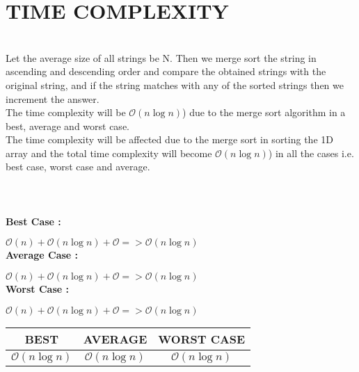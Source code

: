 \documentclass[conference]{IEEEtran}
\begin{document}
\section{TIME COMPLEXITY}\\
Let the average size of all strings be N.
Then we merge sort the string in ascending and 
descending order and compare the obtained strings 
with the original string, and if the string matches 
with any of the sorted strings then we increment the 
answer.\\ 
The time complexity will be \begin{math} \mathcal{O}(n\log{}n)\end{math}) due to the 
merge sort algorithm in a best, average and worst 
case.\\ 
The time complexity will be affected due to the 
merge sort in sorting the 1D array and the total 
time complexity will become \begin{math} \mathcal{O}(n\log{}n)\end{math}) in 
all the cases i.e. best case, worst case and 
average. 
\begin{math}
\end{math}
\\\\\\\\\textbf{Best Case : }

\begin{math}
\mathcal{O}(n) + \mathcal{O}(n\log{}n) + \mathcal{O} => \mathcal{O}(n\log{}n)
\end{math}
\\\textbf{Average Case : }


\begin{math}
\mathcal{O}(n) + \mathcal{O}(n\log{}n) + \mathcal{O} => \mathcal{O}(n\log{}n)
\end{math}
\\\textbf{Worst Case : }


\begin{math}
\mathcal{O}(n) + \mathcal{O}(n\log{}n) + \mathcal{O} => \mathcal{O}(n\log{}n)
\end{math}
\begin{center}
 \begin{tabular}{||c c c||} 
 \hline
  BEST & AVERAGE & WORST CASE  \\  
 \hline\hline
 \begin{math} \mathcal{O}(n\log{}n)
\end{math} & \begin{math} \mathcal{O}(n\log{}n)
\end{math} & \begin{math} \mathcal{O}(n\log{}n)
\end{math} \\ 
 \hline
\end{tabular}
\end{center}
\end{document}
